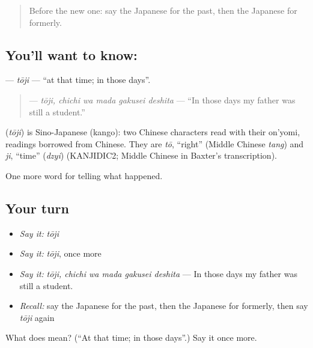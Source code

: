 \label{lesson:JA-C312-touji}



\begin{quote}
Before the new one: say the Japanese for the past, then the Japanese for formerly.
\end{quote}

\subsection*{You'll want to know: }
\textbf{} — \emph{tōji} — \textquotedblleft{}at that time; in those days\textquotedblright{}.

\begin{quote}
\textbf{  } — \emph{tōji, chichi wa mada gakusei deshita} — \textquotedblleft{}In those days my father was still a student.\textquotedblright{}
\end{quote}

\begin{cousinweb}
\textbf{} (\emph{tōji}) is Sino-Japanese (kango): two Chinese characters read with their on'yomi, readings borrowed from Chinese. They are \emph{tō}, \textquotedblleft{}right\textquotedblright{} (Middle Chinese \emph{tang}) and \emph{ji}, \textquotedblleft{}time\textquotedblright{} (\emph{dzyi}) (KANJIDIC2; Middle Chinese in Baxter's transcription).
\end{cousinweb}

\begin{grammarlens}[title={What you've built}]
One more word for telling what happened.
\end{grammarlens}

\subsection*{Your turn}
\begin{itemize}
\raggedright
  \item \emph{Say it:} \emph{tōji}
  \item \emph{Say it:} \emph{tōji}, once more
  \item \emph{Say it:} \emph{tōji, chichi wa mada gakusei deshita} — In those days my father was still a student.
  \item \emph{Recall:} say the Japanese for the past, then the Japanese for formerly, then say \emph{tōji} again
\end{itemize}

\begin{tcolorbox}[breakable,colback=teal!4,colframe=teal!35!black,title={Before you move on}]
What does  mean? (\textquotedblleft{}At that time; in those days\textquotedblright{}.) Say it once more.
\end{tcolorbox}
